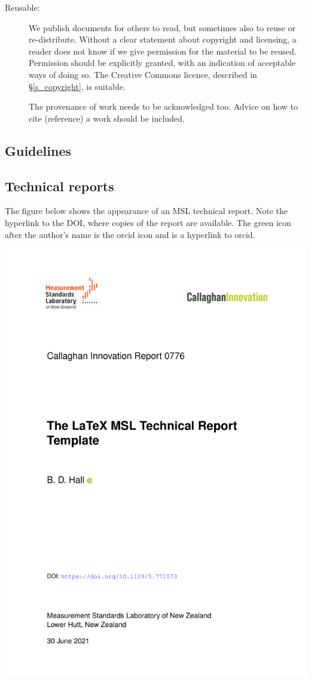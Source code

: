 {\begin{description}
	\item[Reusable: ] We publish documents for others to read, but sometimes also to reuse or re-distribute. Without a clear statement about copyright and licensing, a reader does not know if we give permission for the material to be reused. Permission should be explicitly granted, with an indication of acceptable ways of doing so. The Creative Commons licence, described in \S\ref{s_copyright}, is suitable. 

The provenance of work needs to be acknowledged too. Advice on how to cite (reference) a work should be included. 

\end{description}  

\subsection{Guidelines}
\subsection{Technical reports}
The figure below shows the appearance of an MSL technical report. Note the hyperlink to the DOI, where copies of the report are available. The green icon after the author's name is the orcid icon and is a hyperlink to orcid.

\begin{center}
\includegraphics[scale=.5,page=1]{pictures/Report}
\end{center}

}
